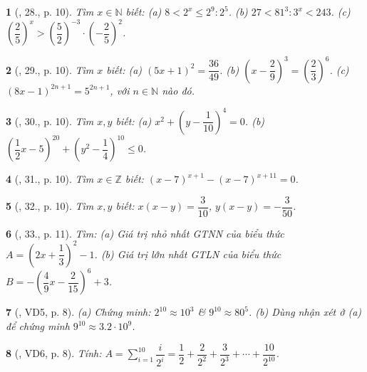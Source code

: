 \documentclass{article}
\newtheorem{baitoan}{}
\begin{document}
\begin{baitoan}[\cite{Tuyen_Toan_7}, 28., p. 10]
	Tìm $x\in\mathbb{N}$ biết: (a) $8 < 2^x\le 2^9:2^5$. (b) $27 < 81^3:3^x < 243$. (c) $\left(\dfrac{2}{5}\right)^x > \left(\dfrac{5}{2}\right)^{-3}\cdot\left(-\dfrac{2}{5}\right)^2$.
\end{baitoan}

\begin{baitoan}[\cite{Tuyen_Toan_7}, 29., p. 10]
	Tìm $x$ biết: (a) $(5x + 1)^2 = \dfrac{36}{49}$. (b) $\left(x - \dfrac{2}{9}\right)^3 = \left(\dfrac{2}{3}\right)^6$. (c) $(8x - 1)^{2n + 1} = 5^{2n + 1}$, với $n\in\mathbb{N}$ nào đó.
\end{baitoan}

\begin{baitoan}[\cite{Tuyen_Toan_7}, 30., p. 10]
	Tìm $x,y$ biết: (a) $x^2 + \left(y - \dfrac{1}{10}\right)^4 = 0$. (b) $\left(\dfrac{1}{2}x - 5\right)^{20} + \left(y^2 - \dfrac{1}{4}\right)^{10}\le 0$.
\end{baitoan}

\begin{baitoan}[\cite{Tuyen_Toan_7}, 31., p. 10]
	Tìm $x\in\mathbb{Z}$ biết: $(x - 7)^{x + 1} - (x - 7)^{x + 11} = 0$.
\end{baitoan}

\begin{baitoan}[\cite{Tuyen_Toan_7}, 32., p. 10]
	Tìm $x,y$ biết: $x(x - y) = \dfrac{3}{10}$, $y(x - y) = -\dfrac{3}{50}$.
\end{baitoan}

\begin{baitoan}[\cite{Tuyen_Toan_7}, 33., p. 11]
	Tìm: (a) Giá trị nhỏ nhất {\rm GTNN} của biểu thức $A = \left(2x + \dfrac{1}{3}\right)^2 - 1$. (b) Giá trị lớn nhất {\rm GTLN} của biểu thức $B = -\left(\dfrac{4}{9}x - \dfrac{2}{15}\right)^6 + 3$.
\end{baitoan}

\begin{baitoan}[\cite{Binh_Toan_7_tap_1}, VD5, p. 8]
	(a) Chứng minh: $2^{10}\approx 10^3$ \& $9^{10}\approx 80^5$. (b) Dùng nhận xét ở (a) để chứng minh $9^{10}\approx 3.2\cdot 10^9$.	
\end{baitoan}

\begin{baitoan}[\cite{Binh_Toan_7_tap_1}, VD6, p. 8]
	Tính: $A = \sum_{i=1}^{10} \dfrac{i}{2^i} = \dfrac{1}{2} + \dfrac{2}{2^2} + \dfrac{3}{2^3} + \cdots + \dfrac{10}{2^{10}}$.
\end{baitoan}
\end{document}

